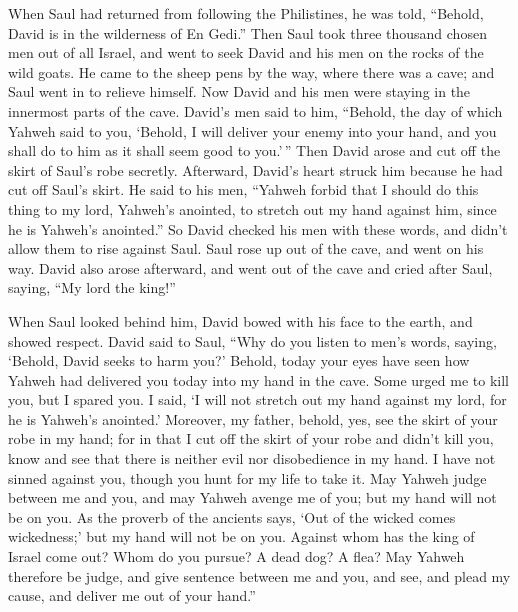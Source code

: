  When Saul had returned from following the Philistines, he
was told, ``Behold, David is in the wilderness of En Gedi.''
 Then Saul took three thousand chosen men out of all
Israel, and went to seek David and his men on the rocks of the wild
goats.  He came to the sheep pens by the way, where there
was a cave; and Saul went in to relieve himself. Now David and his men
were staying in the innermost parts of the cave.  David's
men said to him, ``Behold, the day of which Yahweh said to you, `Behold,
I will deliver your enemy into your hand, and you shall do to him as it
shall seem good to you.'\,'' Then David arose and cut off the skirt of
Saul's robe secretly.  Afterward, David's heart struck him
because he had cut off Saul's skirt.  He said to his men,
``Yahweh forbid that I should do this thing to my lord, Yahweh's
anointed, to stretch out my hand against him, since he is Yahweh's
anointed.''  So David checked his men with these words,
and didn't allow them to rise against Saul. Saul rose up out of the
cave, and went on his way.  David also arose afterward,
and went out of the cave and cried after Saul, saying, ``My lord the
king!''

When Saul looked behind him, David bowed with his face to the earth, and
showed respect.  David said to Saul, ``Why do you listen
to men's words, saying, `Behold, David seeks to harm you?'
 Behold, today your eyes have seen how Yahweh had
delivered you today into my hand in the cave. Some urged me to kill you,
but I spared you. I said, `I will not stretch out my hand against my
lord, for he is Yahweh's anointed.'  Moreover, my father,
behold, yes, see the skirt of your robe in my hand; for in that I cut
off the skirt of your robe and didn't kill you, know and see that there
is neither evil nor disobedience in my hand. I have not sinned against
you, though you hunt for my life to take it.  May Yahweh
judge between me and you, and may Yahweh avenge me of you; but my hand
will not be on you.  As the proverb of the ancients says,
`Out of the wicked comes wickedness;' but my hand will not be on you.
 Against whom has the king of Israel come out? Whom do
you pursue? A dead dog? A flea?  May Yahweh therefore be
judge, and give sentence between me and you, and see, and plead my
cause, and deliver me out of your hand.''

